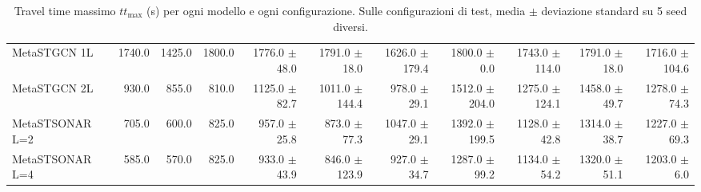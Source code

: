 \begin{table}
\begin{tabular}{@{}lrrrrrrrrrr@{}}
    MetaSTGCN 1L              & 1740.0  & 1425.0  & 1800.0  & 1776.0 {\fontsize{4}{4}\selectfont$\pm$48.0}  & 1791.0 {\fontsize{4}{4}\selectfont$\pm$18.0}  & 1626.0 {\fontsize{4}{4}\selectfont$\pm$179.4} & 1800.0 {\fontsize{4}{4}\selectfont$\pm$0.0}   & 1743.0 {\fontsize{4}{4}\selectfont$\pm$114.0} & 1791.0 {\fontsize{4}{4}\selectfont$\pm$18.0}  & 1716.0 {\fontsize{4}{4}\selectfont$\pm$104.6} \\
    MetaSTGCN 2L              & 930.0   & 855.0   & 810.0   & 1125.0 {\fontsize{4}{4}\selectfont$\pm$82.7}  & 1011.0 {\fontsize{4}{4}\selectfont$\pm$144.4} & 978.0 {\fontsize{4}{4}\selectfont$\pm$29.1}   & 1512.0 {\fontsize{4}{4}\selectfont$\pm$204.0} & 1275.0 {\fontsize{4}{4}\selectfont$\pm$124.1} & 1458.0 {\fontsize{4}{4}\selectfont$\pm$49.7}  & 1278.0 {\fontsize{4}{4}\selectfont$\pm$74.3}  \\
    MetaSTSONAR L=2           & 705.0   & 600.0   & 825.0   & 957.0 {\fontsize{4}{4}\selectfont$\pm$25.8}   & 873.0 {\fontsize{4}{4}\selectfont$\pm$77.3}   & 1047.0 {\fontsize{4}{4}\selectfont$\pm$29.1}  & 1392.0 {\fontsize{4}{4}\selectfont$\pm$199.5} & 1128.0 {\fontsize{4}{4}\selectfont$\pm$42.8}  & 1314.0 {\fontsize{4}{4}\selectfont$\pm$38.7}  & 1227.0 {\fontsize{4}{4}\selectfont$\pm$69.3}  \\
    MetaSTSONAR L=4           & 585.0   & 570.0   & 825.0   & 933.0 {\fontsize{4}{4}\selectfont$\pm$43.9}   & 846.0 {\fontsize{4}{4}\selectfont$\pm$123.9}  & 927.0 {\fontsize{4}{4}\selectfont$\pm$34.7}   & 1287.0 {\fontsize{4}{4}\selectfont$\pm$99.2}  & 1134.0 {\fontsize{4}{4}\selectfont$\pm$54.2}  & 1320.0 {\fontsize{4}{4}\selectfont$\pm$51.1}  & 1203.0 {\fontsize{4}{4}\selectfont$\pm$6.0}   \\
    \bottomrule
  \end{tabular}
  \caption{Travel time massimo $tt_{\max}$ (s) per ogni modello e ogni configurazione. Sulle configurazioni di test, media $\pm$ deviazione standard su 5 seed diversi.}
  \label{tab:ttmax-full}
\end{table}

